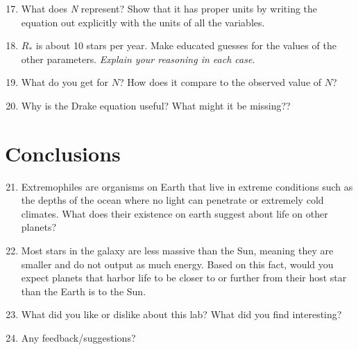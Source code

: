 \documentclass[12pt]{article}%
\begin{document}
\begin{enumerate}
\setcounter{enumi}{16}
\item  What does \emph{N} represent?  
Show that it has proper units by writing the equation out explicitly with the units of all the variables. 


\item  $R_{*}$ is about 10 stars per year.  
Make educated guesses for the values of the other parameters.  \emph{Explain your reasoning in each case.}

\item  What do you get for $N$?  How does it compare to the observed value of $N$?

\item 
Why is the Drake equation useful? What might it be missing??
\end{enumerate}


\section{Conclusions}

\begin{enumerate}
\setcounter{enumi}{20}
\item Extremophiles are organisms on Earth that live in extreme conditions such as the depths of the ocean where no light can penetrate or extremely cold climates.  
What does their existence on earth suggest about life on other planets?  

\item Most stars in the galaxy are less massive than the Sun, meaning they are smaller and do not output as much energy. 
Based on this fact, would you expect planets that harbor life to be closer to or further from their host star than the Earth is to the Sun. 

\item What did you like or dislike about this lab? What did you find interesting?

\item Any feedback/suggestions?

\end{enumerate}
\end{document}
